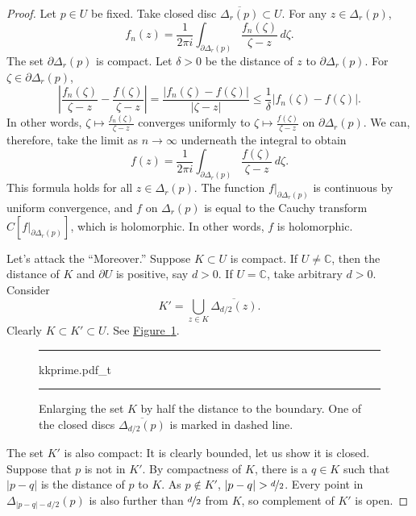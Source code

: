 \documentclass[12pt,openany]{book}
\newcommand{\sabs}[1]{\lvert {#1} \rvert}
\newcommand{\abs}[1]{\left\lvert {#1} \right\rvert}
\newcommand{\C}{{\mathbb{C}}}
\newcommand{\myquote}[1]{``#1''}
\theoremstyle{plain}
\theoremstyle{remark}
\theoremstyle{definition}
\newenvironment{myfig}{%
\begin{figure}[h!t]
\noindent\rule{\textwidth}{0.5pt}\vspace{12pt}\par\centering}%
{\par\noindent\rule{\textwidth}{0.5pt}
\end{figure}}
\theoremstyle{exercise}
\theoremstyle{example}
\newcommand{\figureref}[1]{\hyperref[#1]{Figure~\ref*{#1}}}
\begin{document}
\begin{proof}
Let $p \in U$ be fixed.  Take closed disc $\overline{\Delta_r(p)} \subset
U$.  For any $z \in \Delta_r(p)$,
\begin{equation*}
f_n(z) = \frac{1}{2\pi i}
\int_{\partial \Delta_r(p)} \frac{f_n(\zeta)}{\zeta-z} \, d\zeta .
\end{equation*}
The set $\partial \Delta_r(p)$ is compact.
Let $\delta > 0$ be the distance of $z$ to
$\partial \Delta_r(p)$.
For $\zeta \in \partial \Delta_r(p)$,
\begin{equation*}
\abs{\frac{f_n(\zeta)}{\zeta-z}
-
\frac{f(\zeta)}{\zeta-z}
}
=
\frac{\sabs{f_n(\zeta)-f(\zeta)}}{\sabs{\zeta-z}}
\leq
\frac{1}{\delta}
\sabs{f_n(\zeta)-f(\zeta)} .
\end{equation*}
In other words,
$\zeta \mapsto \frac{f_n(\zeta)}{\zeta-z}$ converges uniformly to 
$\zeta \mapsto \frac{f(\zeta)}{\zeta-z}$ on $\partial \Delta_r(p)$.
We can, therefore, take the limit as $n \to \infty$ underneath the integral
to obtain
\begin{equation*}
f(z) = \frac{1}{2\pi i}
\int_{\partial \Delta_r(p)} \frac{f(\zeta)}{\zeta-z} \, d\zeta .
\end{equation*}
This formula holds for all $z \in \Delta_r(p)$.
The function $f|_{\partial \Delta_r(p)}$ is continuous by uniform
convergence, and $f$ on $\Delta_r(p)$ is equal to
the Cauchy transform
$C[f|_{\partial \Delta_r(p)}]$, which is holomorphic.  In other words,
$f$ is holomorphic.

Let's attack the \myquote{Moreover.}
Suppose $K \subset U$ is compact.  If $U \not= \C$, then the distance of
$K$ and $\partial U$ is positive, say $d > 0$.  If $U=\C$, take arbitrary $d
> 0$.  Consider 
\begin{equation*}
K' = \bigcup_{z \in K} \overline{\Delta_{d/2}(z)} .
\end{equation*}
Clearly $K \subset K' \subset U$.
See \figureref{fig:kkprime}.

\begin{myfig}
{kkprime.pdf_t}
\caption{Enlarging the set $K$ by half the distance to the boundary.  One of
the closed discs $\overline{\Delta_{d/2}(p)}$ is marked in dashed line.\label{fig:kkprime}}
\end{myfig}

The set $K'$ is also compact: It is clearly
bounded, let us show it is closed.  Suppose that $p$ is not in $K'$.
By compactness of $K$, there is a $q \in K$ such that $\sabs{p-q}$
is the distance of $p$ to $K$.  As $p \not\in K'$,
$\sabs{p-q} > \nicefrac{d}{2}$.
Every point in $\Delta_{\sabs{p-q}-d/2}(p)$
is also further than $\nicefrac{d}{2}$ from $K$, so
complement of $K'$ is open.


\end{proof}
\end{document}
